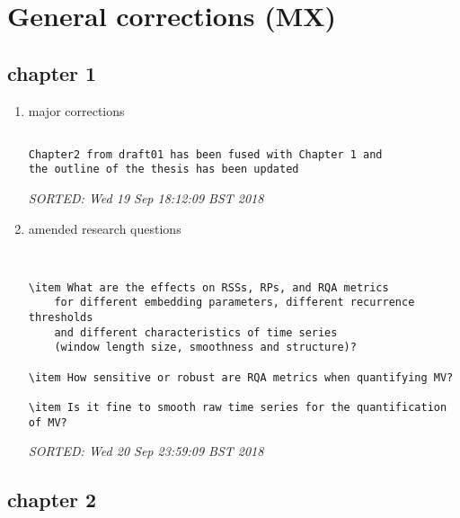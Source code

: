 \documentclass[10pt]{article}
\begin{document}
\section{General corrections (MX)}


\subsection{chapter 1}


\begin{enumerate}


\item major corrections

\begin{verbatim}

Chapter2 from draft01 has been fused with Chapter 1 and 
the outline of the thesis has been updated 

\end{verbatim}
\textit{
SORTED: 
Wed 19 Sep 18:12:09 BST 2018
}
\\

\item amended research questions

\begin{verbatim}


\item What are the effects on RSSs, RPs, and RQA metrics
	for different embedding parameters, different recurrence thresholds 
	and different characteristics of time series 
	(window length size, smoothness and structure)?

\item How sensitive or robust are RQA metrics when quantifying MV?

\item Is it fine to smooth raw time series for the quantification of MV?

\end{verbatim}
\textit{
SORTED: 
Wed 20 Sep 23:59:09 BST 2018
}
\\




\end{enumerate}










\subsection{chapter 2}
\end{document}
